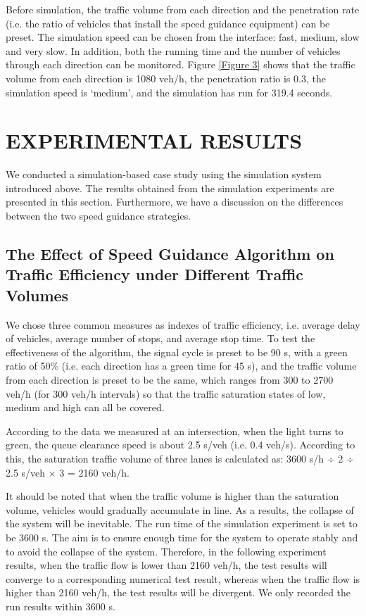 \documentclass[10.5pt,compsoc]{TsT}
\theoremstyle{mystyle}
\begin{document}
{Before simulation, the traffic volume from each direction and the
penetration rate (i.e. the ratio of vehicles that install the speed
guidance equipment) can be preset. The simulation speed can be chosen
from the interface: fast, medium, slow and very slow. In addition, both
the running time and the number of vehicles through each direction can
be monitored. Figure \ref{Figure 3} shows that the traffic volume from each direction
is 1080 veh/h, the penetration ratio is 0.3, the simulation speed is
`medium', and the simulation has run for 319.4 seconds.


\section{EXPERIMENTAL RESULTS}
\noindent
We conducted a simulation-based case study using the simulation system
introduced above. The results obtained from the simulation experiments
are presented in this section. Furthermore, we have a discussion on the
differences between the two speed guidance strategies.

\subsection{The Effect of Speed Guidance Algorithm on Traffic Efficiency under Different Traffic Volumes}
\noindent
We chose three common measures as indexes of traffic efficiency, i.e.
average delay of vehicles, average number of stops, and average stop
time. To test the effectiveness of the algorithm, the signal cycle is
preset to be 90 s, with a green ratio of 50\% (i.e. each direction has a
green time for 45 s), and the traffic volume from each direction is
preset to be the same, which ranges from 300 to 2700 veh/h (for 300
veh/h intervals) so that the traffic saturation states of low, medium
and high can all be covered.

According to the data we measured at an intersection, when the light
turns to green, the queue clearance speed is about 2.5 s/veh (i.e. 0.4
veh/s). According to this, the saturation traffic volume of three lanes
is calculated as: 3600 s/h ÷ 2 ÷ 2.5 s/veh × 3 = 2160 veh/h.

It should be noted that when the traffic volume is higher than the
saturation volume, vehicles would gradually accumulate in line. As a
results, the collapse of the system will be inevitable. The run time of
the simulation experiment is set to be 3600 s. The aim is to ensure
enough time for the system to operate stably and to avoid the collapse
of the system. Therefore, in the following experiment results, when the
traffic flow is lower than 2160 veh/h, the test results will converge to
a corresponding numerical test result, whereas when the traffic flow is
higher than 2160 veh/h, the test results will be divergent. We only
recorded the run results within 3600 s.

}
\end{document}
